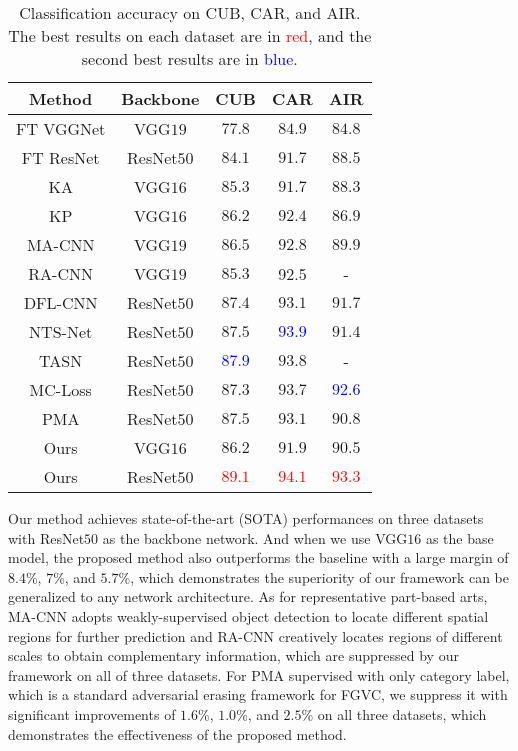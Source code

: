 \documentclass{article}
\begin{document}
\begin{table}[!t]
  \centering
  \caption{Classification accuracy on CUB, CAR, and AIR. The best results on each dataset are in \textcolor{red}{red}, and the second best results are in \textcolor{blue}{blue}.}
  \vspace{+0.3cm}
    \begin{tabular}{|c|c|c|c|c|}
    \hline
 Method  & Backbone & \multicolumn{1}{l|}{CUB} & \multicolumn{1}{l|}{CAR} & \multicolumn{1}{l|}{AIR}\\
 \hline
 \hline
FT VGGNet \cite{wang2018learning} & VGG$19$ & $77.8$ & $84.9$ & $84.8$ \\
FT ResNet \cite{wang2018learning} & ResNet$50$ & $84.1$ & $91.7$ & $88.5$ \\
KA \cite{cai2017higher} & VGG$16$ & $85.3$ & $91.7$ & $88.3$ \\
KP \cite{cui2017kernel} & VGG$16$ & $86.2$ & $92.4$ & $86.9$ \\
MA-CNN \cite{zheng2017learning} & VGG$19$ & $86.5$ & $92.8$ & $89.9$ \\
RA-CNN \cite{fu2017look} & VGG$19$ & $85.3$ & 92.5 & - \\
DFL-CNN \cite{wang2018learning} & ResNet$50$ & $87.4$ & $93.1$ & $91.7$ \\
NTS-Net \cite{yang2018learning} & ResNet$50$ & $87.5$ & \textcolor{blue}{$93.9$} & $91.4$ \\
TASN \cite{8953519} & ResNet$50$ &  \textcolor{blue}{$87.9$} & $93.8$ & - \\
MC-Loss \cite{chang2019the} & ResNet$50$ & $87.3$ & $93.7$ & \textcolor{blue}{$92.6$} \\
PMA \cite{9103943} & ResNet$50$ & $87.5$ & $93.1$ & $90.8$ \\
   \hline
   \hline
Ours & VGG$16$ & $86.2$ & $91.9$ & $90.5$ \\
Ours & ResNet$50$ &  \textcolor{red}{$89.1$} & \textcolor{red}{$94.1$} & \textcolor{red}{$93.3$} \\
   \hline
    \end{tabular}\label{tab:sota}\end{table}

Our method achieves state-of-the-art (SOTA) performances on three datasets with ResNet$50$ as the backbone network. And when we use VGG$16$ as the base model, the proposed method also outperforms the baseline with a large margin of $8.4$\%, $7$\%, and $5.7$\%, which demonstrates the superiority of our framework can be generalized to any network architecture. As for representative part-based arts, MA-CNN \cite{zheng2017learning} adopts weakly-supervised object detection to locate different spatial regions for further prediction and RA-CNN \cite{fu2017look} creatively locates regions of different scales to obtain complementary information, which are suppressed by our framework on all of three datasets. For PMA \cite{9103943} supervised with only category label, which is a standard adversarial erasing framework for FGVC, we suppress it with significant improvements of $1.6\%$, $1.0\%$, and $2.5\%$ on all three datasets, which demonstrates the effectiveness of the proposed method. 
\end{document}
